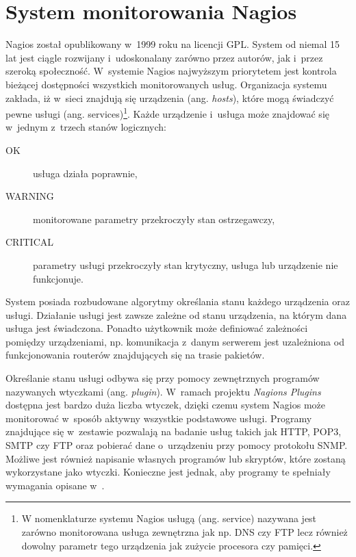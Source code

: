 \section[Nagios][System monitorowania Nagios]{System monitorowania Nagios}

Nagios\cite{www:Nagios} został opublikowany w~1999 roku na licencji GPL. System od
niemal 15 lat jest ciągle rozwijany i~udoskonalany zarówno przez
autorów, jak i~przez szeroką społeczność. W~systemie Nagios najwyższym
priorytetem jest kontrola bieżącej dostępności wszystkich
monitorowanych usług. Organizacja systemu zakłada, iż w~sieci znajdują
się urządzenia (ang. {\em hosts}), które mogą świadczyć pewne usługi
(ang. services)\footnote{W nomenklaturze systemu Nagios usługą
  (ang. service) nazywana jest zarówno monitorowana usługa zewnętrzna
  jak np. DNS czy FTP lecz również dowolny parametr tego urządzenia
  jak zużycie procesora czy pamięci.}. Każde urządzenie i~usługa może
  znajdować się w~jednym z~trzech stanów logicznych:

\begin{description}
\item[OK] usługa działa poprawnie,
\item[WARNING] monitorowane parametry przekroczyły stan ostrzegawczy,
\item[CRITICAL] parametry usługi przekroczyły stan krytyczny, usługa
  lub urządzenie nie funkcjonuje.
\end{description}

System posiada rozbudowane algorytmy określania stanu każdego
urządzenia oraz usługi. Działanie usługi jest zawsze zależne od stanu
urządzenia, na którym dana usługa jest świadczona. Ponadto użytkownik
może definiować zależności pomiędzy urządzeniami, np. komunikacja
z~danym serwerem jest uzależniona od funkcjonowania routerów
znajdujących się na trasie pakietów.

Określanie stanu usługi odbywa się przy pomocy zewnętrznych programów
nazywanych wtyczkami (ang. {\em plugin}). W~ramach projektu {\em
  Nagions Plugins}\cite{www:NagiosPluginProject} dostępna jest bardzo
duża liczba wtyczek, dzięki czemu system Nagios może monitorować
w~sposób aktywny wszystkie podstawowe usługi. Programy znajdujące się
w~zestawie pozwalają na badanie usług takich jak HTTP, POP3, SMTP czy
FTP oraz pobierać dane o~urządzeniu przy pomocy protokołu
SNMP. Możliwe jest również napisanie własnych programów lub skryptów,
które zostaną wykorzystane jako wtyczki. Konieczne jest jednak, aby
programy te spełniały wymagania opisane
w~\cite{www:NagiosPluginsTutorial}.

